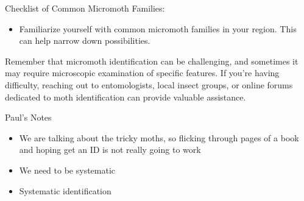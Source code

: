 \documentclass[
  ignorenonframetext,
]{beamer}
\providecommand{\tightlist}{%
  \setlength{\itemsep}{0pt}\setlength{\parskip}{0pt}}
\begin{document}
\begin{frame}{Checklist of Common Micromoth Families:}
\protect\hypertarget{checklist-of-common-micromoth-families}{}
\begin{itemize}
\tightlist
\item
  Familiarize yourself with common micromoth families in your region.
  This can help narrow down possibilities.
\end{itemize}

Remember that micromoth identification can be challenging, and sometimes
it may require microscopic examination of specific features. If you're
having difficulty, reaching out to entomologists, local insect groups,
or online forums dedicated to moth identification can provide valuable
assistance.
\end{frame}

\begin{frame}{Paul's Notes}
\protect\hypertarget{pauls-notes}{}
\begin{itemize}
\tightlist
\item
  We are talking about the tricky moths, so flicking through pages of a
  book and hoping get an ID is not really going to work
\item
  We need to be systematic
\item
  Systematic identification
\end{itemize}
\end{frame}
\end{document}
